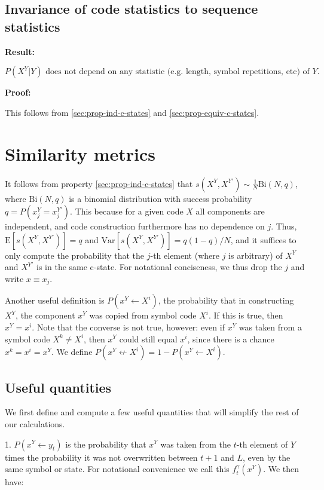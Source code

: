 \documentclass{article}
\begin{document}
\subsection{Invariance of code statistics to sequence statistics}

\textbf{Result:}

$$P(X^Y|Y) \textrm{ does not depend on any statistic (e.g. length, symbol repetitions, etc) of } Y.$$

\textbf{Proof:}

This follows from \ref{sec:prop-ind-c-states} and \ref{sec:prop-equiv-c-states}.

\section{Similarity metrics}

It follows from property \ref{sec:prop-ind-c-states} that $s(X^Y, X^{Y'}) \sim \frac{1}{N}\textrm{Bi}(N, q)$, where $\textrm{Bi}(N, q)$ is a binomial distribution with success probability $q = P(x^Y_j = x^{Y'}_j)$. This because for a given code $X$ all components are independent, and code construction furthermore has no dependence on $j$. Thus, $\textrm{E}[s(X^Y, X^{Y'})] = q$ and $\textrm{Var}[s(X^Y, X^{Y'})] = q(1-q)/N$, and it suffices to only compute the probability that the $j$-th element (where $j$ is arbitrary) of $X^Y$ and $X^{Y'}$ is in the same c-state. For notational conciseness, we thus drop the $j$ and write $x \equiv x_j$.

Another useful definition is $P(x^Y \leftarrow X^i)$, the probability that in constructing $X^Y$, the component $x^Y$ was copied from symbol code $X^i$. If this is true, then $x^Y = x^i$. Note that the converse is not true, however: even if $x^Y$ was taken from a symbol code $X^k \neq X^i$, then $x^Y$ could still equal $x^i$, since there is a chance $x^k = x^i = x^Y$. We define $P(x^Y \not \leftarrow X^i) = 1 - P(x^Y \leftarrow X^i)$.

\subsection{Useful quantities}

We first define and compute a few useful quantities that will simplify the rest of our calculations.

1. $P(x^Y \leftarrow y_t)$ is the probability that $x^Y$ was taken from the $t$-th element of $Y$ times the probability it was not overwritten between $t+1$ and $L$, even by the same symbol or state. For notational convenience we call this $f^\gamma_t(x^Y)$. We then have:
\end{document}
